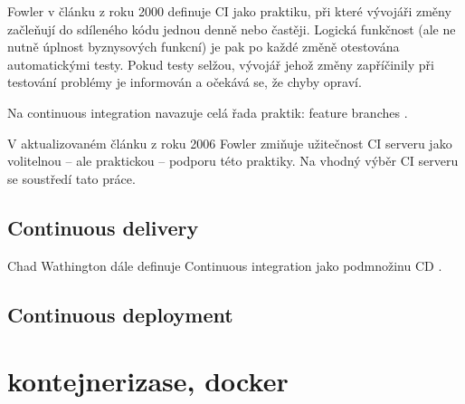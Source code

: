             Fowler v článku z roku 2000 \cite{fowler-ci-original} definuje CI jako praktiku, při které vývojáři změny začleňují do sdíleného kódu jednou denně nebo častěji. Logická funkčnost (ale ne nutně úplnost byznysových funkcní) je pak po každé změně otestována automatickými testy. Pokud testy selžou, vývojář jehož změny zapříčinily při testování problémy je informován a očekává se, že chyby opraví.

            Na continuous integration navazuje celá řada praktik: feature branches .

            V aktualizovaném článku z roku 2006 Fowler \cite{fowler-ci} zmiňuje užitečnost CI serveru jako volitelnou -- ale praktickou -- podporu této praktiky. Na vhodný výběr CI serveru se soustředí tato práce.

        \subsection{Continuous delivery}
            Chad Wathington dále definuje Continuous integration jako podmnožinu CD \cite{fowler-go}.

        \subsection{Continuous deployment}


        \blind[6]

    \section{kontejnerizase, docker}
        \blind[2]
